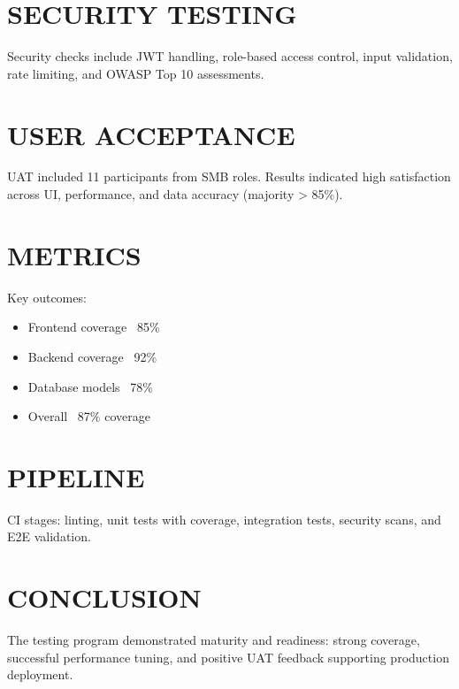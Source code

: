 \section{SECURITY TESTING}

Security checks include JWT handling, role-based access control, input validation, rate limiting, and OWASP Top 10 assessments.

\section{USER ACCEPTANCE}

UAT included 11 participants from SMB roles. Results indicated high satisfaction across UI, performance, and data accuracy (majority > 85\%).

\section{METRICS}

Key outcomes:
\begin{itemize}
	\item Frontend coverage ~85\%
	\item Backend coverage ~92\%
	\item Database models ~78\%
	\item Overall ~87\% coverage
\end{itemize}

\section{PIPELINE}

CI stages: linting, unit tests with coverage, integration tests, security scans, and E2E validation.

\section{CONCLUSION}

The testing program demonstrated maturity and readiness: strong coverage, successful performance tuning, and positive UAT feedback supporting production deployment.